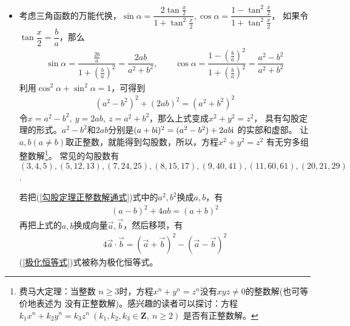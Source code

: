 \begin{itemize}[leftmargin=\inteval{\myitemleftmargin}pt,itemsep=
   \inteval{\myitemitempsep}pt,topsep=\inteval{\myitemtopsep}pt]
\item 考虑三角函数的万能代换，$ \sin\alpha=\dfrac{2\tan \frac{x}{2}}{1+\tan^2 \frac{x}{2}},\cos\alpha=\dfrac{1-\tan^2 \frac{x}{2}}{1+\tan^2 \frac{x}{2}} $，
如果令$ \tan\dfrac{x}{2}=\dfrac{b}{a} $，那么
\begin{align*}
    \sin\alpha=\dfrac{\frac{2b}{a}}{1+\left(\frac{b}{a}\right)^2}=
    \dfrac{2ab}{a^2+b^2},\quad\quad \cos\alpha=\dfrac{1-\left(\frac{b}{a}
    \right)^2}{1+\left(\frac{b}{a}\right)^2}=\dfrac{a^2-b^2}{a^2+b^2}
\end{align*}
利用$ \cos^2 \alpha+\sin^2 \alpha=1 $，可得到
\begin{gather}\label{勾股定理正整数解通式}
    (a^2-b^2)^2+(2ab)^2=(a^2+b^2)^2
\end{gather}
令$ x=a^2-b^2,\ y=2ab,\ z=a^2+b^2 $，那么上式变成$ x^2+y^2=z^2 $，
具有勾股定理的形式。$ a^2-b^2 $和$ 2ab $分别是$ (a+b\mathrm{i})^2=(a^2-b^2)+2ab\mathrm{i} $
的实部和虚部。
让$ a,b (a\neq b) $取正整数，就能得到勾股数，所以，方程$ x^2+y^2=z^2 $
有无穷多组整数解\footnote{费马大定理：当整数
$ n\geq 3 $时，方程$ x^n+y^n=z^n $没有$ xyz\neq 0 $的整数解(也可等价地表述为
没有正整数解)。感兴趣的读者可以探讨：方程$ k_1 x^n+k_2 y^n=k_3 z^n \ 
(k_1,k_2,k_3\in \textbf{Z},\ n\geq 2 ) $ 是否有正整数解。}。
常见的勾股数有 $ (3,4,5),(5,12,13),(7,24,25),(8,15,17),(9,40,41),
(11,60,61),(20,21,29) $. 

若把(\ref{勾股定理正整数解通式})式中的$ a^2,b^2 $换成$ a,b $，有
\begin{align*}
    (a-b)^2+4ab=(a+b)^2
\end{align*}
再把上式的$ a,b $换成向量$ \vec{a},\vec{b} $，然后移项，有
\begin{align}\label{极化恒等式}
    4 \vec{a}\cdot \vec{b}=
    (\vec{a}+\vec{b})^2-(\vec{a}-\vec{b})^2
\end{align}
(\ref{极化恒等式})式被称为极化恒等式。


\end{itemize}
